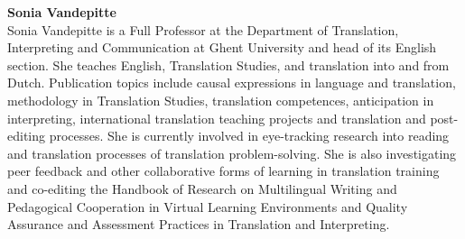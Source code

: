 \medskip\noindent
\textbf{Sonia Vandepitte }\\
Sonia Vandepitte is a Full Professor at the Department of Translation, Interpreting and Communication at Ghent University and head of its English section. She teaches English, Translation Studies, and translation into and from Dutch. Publication topics include causal expressions in language and translation, methodology in Translation Studies, translation competences, anticipation in interpreting, international translation teaching projects and translation and post-editing processes. She is currently involved in eye-tracking research into reading and translation processes of translation problem-solving. She is also investigating peer feedback and other collaborative forms of learning in translation training and co-editing the Handbook of Research on Multilingual Writing and Pedagogical Cooperation in Virtual Learning Environments and Quality Assurance and Assessment Practices in Translation and Interpreting.